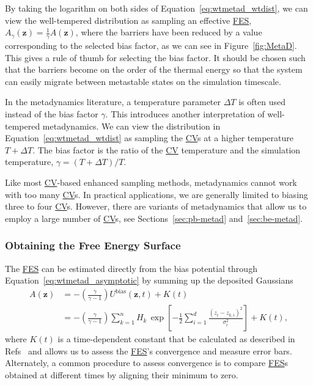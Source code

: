 \documentclass[9pt,review]{livecoms}
\newcommand{\vz}{\mathbf{z}}
\begin{document}
By taking the logarithm on both sides of Equation~\ref{eq:wtmetad_wtdist}, we can view the well-tempered distribution as sampling an effective \hyperlink{ref:FES} {FES},  $A_{\gamma}(\vz) = \frac{1}{\gamma} A(\vz)$, where the barriers have been reduced by a value corresponding to the selected bias factor, as we can see in Figure~\ref{fig:MetaD}. This gives a rule of thumb for selecting the bias factor. It should be chosen such that the barriers become on the order of the thermal energy so that the system can easily migrate between metastable states on the simulation timescale.

In the metadynamics literature, a temperature parameter $\Delta T$ is often used instead of the bias factor $\gamma$. This introduces another interpretation of well-tempered metadynamics. We can view the distribution in Equation~\ref{eq:wtmetad_wtdist} as sampling the \hyperlink{ref:CV} {CV}s at a higher temperature $T+\Delta T$. The bias factor is the ratio of the \hyperlink{ref:CV} {CV} temperature and the simulation temperature, $\gamma = (T + \Delta T)/T$.

Like most \hyperlink{ref:CV} {CV}-based enhanced sampling methods, metadynamics cannot work with too many \hyperlink{ref:CV} {CV}s. In practical applications, we are generally limited to biasing three to four \hyperlink{ref:CV} {CV}s. However, there are variants of metadynamics that allow us to employ a large number of \hyperlink{ref:CV} {CV}s, see Sections~\ref{sec:pb-metad} and~\ref{sec:be-metad}.

\subsubsection{Obtaining the Free Energy Surface}
\label{sec:metad_obtaining_fes}

The \hyperlink{ref:FES} {FES} can be estimated directly from the bias potential through Equation~\ref{eq:wtmetad_asymptotic} by summing up the deposited Gaussians
\begin{align}
\label{eq:metad_sumhills}
A(\vz) &=
- \left(\frac{\gamma}{\gamma-1}\right) U^{\mathrm{bias}}(\vz,t) + K(t)
\nonumber \\
& =
- \left(\frac{\gamma}{\gamma-1}\right)
\sum_{k=1}^{n}
H_{k} \,
\exp \left[-\frac{1}{2}\sum^{d}_{i=1} \frac{(z_i-z_{k,i})^2}{\sigma^2_i} \right] + K(t),
\end{align}
where $K(t)$ is a time-dependent constant that be calculated as described in Refs~\cite{tiwary_rewt,Valsson2016_ARPC_MetaD} and allows us to assess the \hyperlink{ref:FES} {FES}'s convergence and measure error bars. Alternately, a common procedure to assess convergence is to compare \hyperlink{ref:FES} {FES}s obtained at different times by aligning their minimum to zero.
\end{document}
